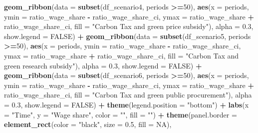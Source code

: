 \documentclass[
]{article}
\newenvironment{Shaded}{\begin{snugshade}}{\end{snugshade}}
\newcommand{\AttributeTok}[1]{\textcolor[rgb]{0.13,0.29,0.53}{#1}}
\newcommand{\ConstantTok}[1]{\textcolor[rgb]{0.56,0.35,0.01}{#1}}
\newcommand{\DecValTok}[1]{\textcolor[rgb]{0.00,0.00,0.81}{#1}}
\newcommand{\FloatTok}[1]{\textcolor[rgb]{0.00,0.00,0.81}{#1}}
\newcommand{\FunctionTok}[1]{\textcolor[rgb]{0.13,0.29,0.53}{\textbf{#1}}}
\newcommand{\NormalTok}[1]{#1}
\newcommand{\SpecialCharTok}[1]{\textcolor[rgb]{0.81,0.36,0.00}{\textbf{#1}}}
\newcommand{\StringTok}[1]{\textcolor[rgb]{0.31,0.60,0.02}{#1}}
\begin{document}
\begin{Shaded}
\begin{Highlighting}[]
  \FunctionTok{geom\_ribbon}\NormalTok{(}\AttributeTok{data =} \FunctionTok{subset}\NormalTok{(df\_scenario4, periods }\SpecialCharTok{\textgreater{}=}\DecValTok{50}\NormalTok{), }\FunctionTok{aes}\NormalTok{(}\AttributeTok{x =}\NormalTok{ periods, }\AttributeTok{ymin =}\NormalTok{ ratio\_wage\_share }\SpecialCharTok{{-}}\NormalTok{ ratio\_wage\_share\_ci, }\AttributeTok{ymax =}\NormalTok{ ratio\_wage\_share }\SpecialCharTok{+}\NormalTok{ ratio\_wage\_share\_ci, }\AttributeTok{fill =} \StringTok{"Carbon Tax and green price subsidy"}\NormalTok{), }\AttributeTok{alpha =} \FloatTok{0.3}\NormalTok{, }\AttributeTok{show.legend =} \ConstantTok{FALSE}\NormalTok{) }\SpecialCharTok{+}
  \FunctionTok{geom\_ribbon}\NormalTok{(}\AttributeTok{data =} \FunctionTok{subset}\NormalTok{(df\_scenario5, periods }\SpecialCharTok{\textgreater{}=}\DecValTok{50}\NormalTok{), }\FunctionTok{aes}\NormalTok{(}\AttributeTok{x =}\NormalTok{ periods, }\AttributeTok{ymin =}\NormalTok{ ratio\_wage\_share }\SpecialCharTok{{-}}\NormalTok{ ratio\_wage\_share\_ci, }\AttributeTok{ymax =}\NormalTok{ ratio\_wage\_share }\SpecialCharTok{+}\NormalTok{ ratio\_wage\_share\_ci, }\AttributeTok{fill =} \StringTok{"Carbon Tax and green research subsidy"}\NormalTok{), }\AttributeTok{alpha =} \FloatTok{0.3}\NormalTok{, }\AttributeTok{show.legend =} \ConstantTok{FALSE}\NormalTok{) }\SpecialCharTok{+}
  \FunctionTok{geom\_ribbon}\NormalTok{(}\AttributeTok{data =} \FunctionTok{subset}\NormalTok{(df\_scenario6, periods }\SpecialCharTok{\textgreater{}=}\DecValTok{50}\NormalTok{), }\FunctionTok{aes}\NormalTok{(}\AttributeTok{x =}\NormalTok{ periods, }\AttributeTok{ymin =}\NormalTok{ ratio\_wage\_share }\SpecialCharTok{{-}}\NormalTok{ ratio\_wage\_share\_ci, }\AttributeTok{ymax =}\NormalTok{ ratio\_wage\_share }\SpecialCharTok{+}\NormalTok{ ratio\_wage\_share\_ci, }\AttributeTok{fill =} \StringTok{"Carbon Tax and green public procurement"}\NormalTok{), }\AttributeTok{alpha =} \FloatTok{0.3}\NormalTok{, }\AttributeTok{show.legend =} \ConstantTok{FALSE}\NormalTok{) }\SpecialCharTok{+}
  \FunctionTok{theme}\NormalTok{(}\AttributeTok{legend.position =} \StringTok{"bottom"}\NormalTok{) }\SpecialCharTok{+}
  \FunctionTok{labs}\NormalTok{(}\AttributeTok{x =} \StringTok{"Time"}\NormalTok{, }\AttributeTok{y =} \StringTok{"Wage share"}\NormalTok{, }\AttributeTok{color =} \StringTok{""}\NormalTok{, }\AttributeTok{fill =} \StringTok{""}\NormalTok{) }\SpecialCharTok{+}
  \FunctionTok{theme}\NormalTok{(}\AttributeTok{panel.border =} \FunctionTok{element\_rect}\NormalTok{(}\AttributeTok{color =} \StringTok{"black"}\NormalTok{, }\AttributeTok{size =} \FloatTok{0.5}\NormalTok{, }\AttributeTok{fill =} \ConstantTok{NA}\NormalTok{),}

\end{Highlighting}
\end{Shaded}
\end{document}
